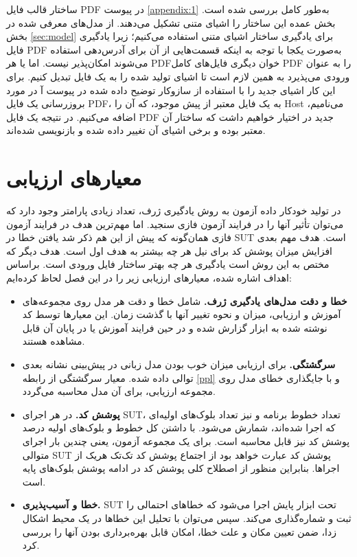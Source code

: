   
 ساختار قالب فایل \gls{PDF} در پیوست \ref{appendix:1} به‌طور کامل بررسی شده است. بخش عمده این ساختار را اشیای متنی تشکیل می‌دهند. از مدل‌های معرفی شده در بخش \ref{sec:model} برای یادگیری ساختار اشیای متنی استفاده می‌کنیم؛ زیرا یادگیری فایل  \gls{PDF} به‌صورت یکجا با توجه به اینکه قسمت‌هایی از آن برای آدرس‌دهی استفاده می‌شوند امکان‌پذیر نیست. اما  یا هر \gls{PDF}خوان دیگری فایل‌های کامل \gls{PDF} را به عنوان ورودی می‌پذیرد به همین لازم است تا اشیای تولید شده را به یک فایل تبدیل کنیم. برای این کار اشیای جدید را با استفاده از سازوکار توضیح داده شده در پیوست آ در مورد بروزرسانی یک فایل \gls{PDF}، به یک فایل معتبر از پیش موجود، که آن را  \gls{Host} می‌نامیم، اضافه می‌کنیم. در نتیجه یک فایل \gls{PDF} جدید در اختیار خواهیم داشت که ساختار آن معتبر بوده و برخی اشیای آن تغییر داده شده و بازنویسی شده‌اند.
 
 
 
 \section{معیارهای ارزیابی}
 در تولید خودکار داده آزمون به روش یادگیری ژرف، تعداد زیادی پارامتر وجود دارد که می‌توان تأثیر آنها را در فرایند آزمون فازی سنجید. اما مهم‌ترین هدف در فرایند آزمون فازی همان‌گونه که پیش از این هم ذکر شد یافتن خطا در \gls{SUT} است. هدف مهم بعدی افزایش میزان پوشش کد برای نیل هر چه بیشتر به هدف اول است. هدف دیگر که مختص به این روش است یادگیری هر چه بهتر ساختار فایل ورودی است. براساس اهداف اشاره شده، معیارهای ارزیابی زیر را در این فصل لحاظ کرده‌ایم:
 \begin{itemize}
 	\item {
 		\textbf{خطا و دقت مدل‌های یادگیری ژرف.}
 	 شامل خطا و دقت هر مدل‌ روی مجموعه‌های آموزش و ارزیابی، میزان و نحوه تغییر آنها با گذشت زمان. این معیارها توسط کد نوشته شده به ابزار  گزارش شده و در حین فرایند آموزش یا در پایان آن قابل مشاهده هستند.
 
}
	\item {
	\textbf{سرگشتگی.}
	برای ارزیابی میزان خوب بودن مدل زبانی در پیش‌بینی نشانه بعدی توالی داده شده. معیار سرگشتگی از رابطه \ref{ppl} و با جایگذاری خطای مدل روی مجموعه ارزیابی، برای آن مدل محاسبه می‌گردد.
	
}

\item {
	\textbf{پوشش کد.}
	در هر اجرای \gls{SUT}، تعداد خطوط برنامه و نیز تعداد بلوک‌های اولیه‌ای که اجرا شده‌اند، شمارش می‌شود. با داشتن کل خطوط و بلوک‌های اولیه درصد پوشش کد نیز قابل محاسبه است. برای یک مجموعه آزمون، یعنی چندین بار اجرای متوالی \gls{SUT} پوشش کد عبارت خواهد بود از اجتماع پوشش کد تک‌تک هریک از اجراها. بنابراین منظور از اصطلاح کلی پوشش کد در ادامه پوشش بلوک‌های پایه است.  
	
}
\item {
\textbf{خطا و آسیب‌پذیری.}
\gls{SUT}
تحت ابزار پایش  اجرا می‌شود که خطاهای احتمالی را ثبت و شماره‌گذاری می‌کند. سپس می‌توان با تحلیل این خطاها در یک محیط اشکال زدا، ضمن تعیین مکان و علت خطا، امکان قابل بهره‌برداری بودن آنها را بررسی کرد.
}
 \end{itemize}

